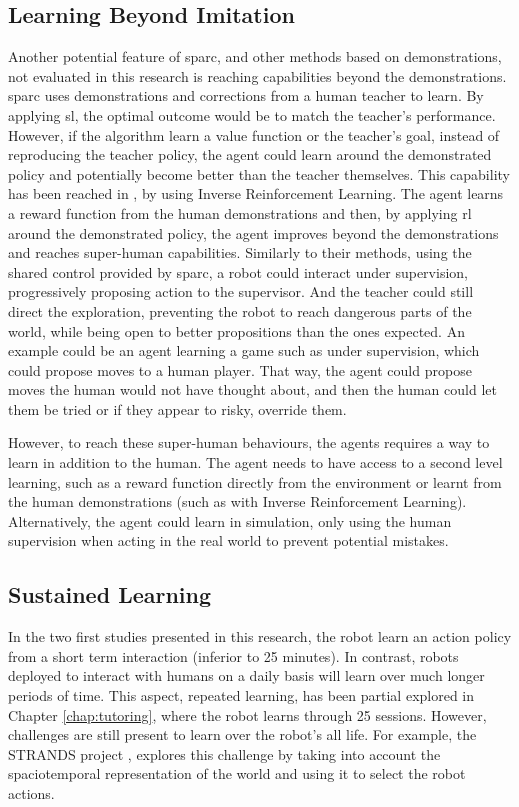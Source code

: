 \subsection{Learning Beyond Imitation}
Another potential feature of \gls{sparc}, and other methods based on demonstrations, not evaluated in this research is reaching capabilities beyond the demonstrations. \gls{sparc} uses demonstrations and corrections from a human teacher to learn. By applying \gls{sl}, the optimal outcome would be to match the teacher's performance. However, if the algorithm learn a value function or the teacher's goal, instead of reproducing the teacher policy, the agent could learn around the demonstrated policy and potentially become better than the teacher themselves. This capability has been reached in \cite{abbeel2004apprenticeship}, by using Inverse Reinforcement Learning. The agent learns a reward function from the human demonstrations and then, by applying \gls{rl} around the demonstrated policy, the agent improves beyond the demonstrations and reaches super-human capabilities. Similarly to their methods, using the shared control provided by \gls{sparc}, a robot could interact under supervision, progressively proposing action to the supervisor. And the teacher could still direct the exploration, preventing the robot to reach dangerous parts of the world, while being open to better propositions than the ones expected. An example could be an agent learning a game such as under supervision, which could propose moves to a human player. That way, the agent could propose moves the human would not have thought about, and then the human could let them be tried or if they appear to risky, override them. 

However, to reach these super-human behaviours, the agents requires a way to learn in addition to the human. The agent needs to have access to a second level learning, such as a reward function directly from the environment or learnt from the human demonstrations (such as with Inverse Reinforcement Learning). Alternatively, the agent could learn in simulation, only using the human supervision when acting in the real world to prevent potential mistakes.

\subsection{Sustained Learning}

In the two first studies presented in this research, the robot learn an action policy from a short term interaction (inferior to 25 minutes). In contrast, robots deployed to interact with humans on a daily basis will learn over much longer periods of time. This aspect, repeated learning, has been partial explored in Chapter \ref{chap:tutoring}, where the robot learns through 25 sessions. However, challenges are still present to learn over the robot's all life. For example, the STRANDS project \cite{hawes2017strands}, explores this challenge by taking into account the spaciotemporal representation of the world and using it to select the robot actions.

